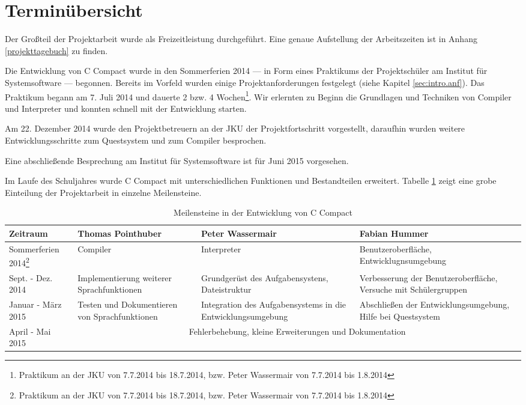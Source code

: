 \section{Terminübersicht}

Der Großteil der Projektarbeit wurde als Freizeitleistung durchgeführt. Eine genaue Aufstellung der Arbeitszeiten ist in Anhang \ref{projekttagebuch} zu finden.

Die Entwicklung von C Compact wurde in den Sommerferien 2014 --- in Form eines Praktikums der Projektschüler am Institut für Systemsoftware --- begonnen. Bereits im Vorfeld wurden einige Projektanforderungen festgelegt (siehe Kapitel \ref{sec:intro.anf}). Das Praktikum begann am 7. Juli 2014 und dauerte 2 bzw. 4 Wochen\footnote{Praktikum an der JKU von 7.7.2014 bis 18.7.2014, bzw. Peter Wassermair von 7.7.2014 bis 1.8.2014}. Wir erlernten zu Beginn die Grundlagen und Techniken von Compiler und Interpreter und konnten schnell mit der Entwicklung starten.

Am 22. Dezember 2014 wurde den Projektbetreuern an der JKU der Projektfortschritt vorgestellt, daraufhin wurden weitere Entwicklungsschritte zum Questsystem und zum Compiler besprochen.

Eine abschließende Besprechung am Institut für Systemsoftware ist für Juni 2015 vorgesehen.

Im Laufe des Schuljahres wurde C Compact mit unterschiedlichen Funktionen und Bestandteilen erweitert. Tabelle \ref{tab:intro-milestones} zeigt eine grobe Einteilung der Projektarbeit in einzelne Meilensteine.

\begin{table}[h!]
\def\arraystretch{1.6}
\begin{tabularx}{\columnwidth}{|l|XXX|}
\hline
  \textbf{Zeitraum}&\textbf{Thomas Pointhuber}&\textbf{Peter Wassermair}&\textbf{Fabian Hummer}\\
  \hline
  Sommerferien 2014\footnote{Praktikum an der JKU von 7.7.2014 bis 18.7.2014, bzw. Peter Wassermair von 7.7.2014 bis 1.8.2014} & Compiler & Interpreter & Benutzeroberfläche, Entwicklugnsumgebung \\
  Sept. - Dez. 2014 & Implementierung weiterer Sprachfunktionen & Grundgerüst des Aufgabensystens, Dateistruktur & Verbesserung der Benutzeroberfläche, Versuche mit Schülergruppen \\
  Januar - März 2015 & Testen und Dokumentieren von Sprachfunktionen & Integration des Aufgabensystems in die Entwicklungsumgebung & Abschließen der Entwicklungsumgebung, Hilfe bei Questsystem\\
  April - Mai 2015 & \multicolumn{3}{c}{Fehlerbehebung, kleine Erweiterungen und Dokumentation}\\
  \hline
\end{tabularx}
\caption{Meilensteine in der Entwicklung von C Compact}
\label{tab:intro-milestones}
\end{table}


